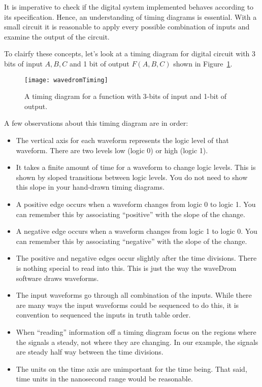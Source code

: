 It is imperative to check if the digital system implemented
behaves according to its specification. Hence, an understanding of
timing diagrams is essential.  With a small circuit it is reasonable
to apply every possible combination of inputs and examine the 
output of the circuit.  

To clairfy these concepts, let's look at a timing diagram for digital circuit
with 3 bits of input $A, B, C$ and 1 bit of output $F(A,B,C)$ shown in
Figure~\ref{fig:represenationsTime}.

\begin{figure}[ht]
\texttt{[image: wavedromTiming]}
\caption{A timing diagram for a function with 3-bits of input and 1-bit of output.}
\label{fig:represenationsTime}
\end{figure}

A few observations about this timing diagram are in order:
\begin{itemize}
\item The vertical axis for each waveform represents the logic level of that
waveform.  There are two levels low (logic 0) or high (logic 1).

\item It takes a finite amount of time for a waveform to change logic 
levels.  This is shown by sloped transitions between logic levels.  You do
not need to show this slope in your hand-drawn timing diagrams.

\item A positive edge occurs when a waveform changes from logic 0 to logic 1.  
You can remember this by associating ``positive'' with the slope of the change.

\item A negative edge occurs when a waveform changes from logic 1 to logic 0. 
You can remember this by associating ``negative'' with the slope of the change.

\item The positive and negative edges occur slightly after the time divisions.
There is nothing special to read into this. This is just the way the waveDrom software 
draws waveforms.

\item The input waveforms go through all combination of the inputs.
While there are many ways the input waveforms could be sequenced 
to do this, it is convention to sequenced the inputs in truth table order.

\item When ``reading'' information off a timing diagram focus on
the regions where the signals a steady, not where they are changing.
In our example, the signals are steady half way between the time 
divisions.

\item The units on the time axis are unimportant for the time being.
That said, time units in the nanosecond range would be reasonable.  
\end{itemize}

